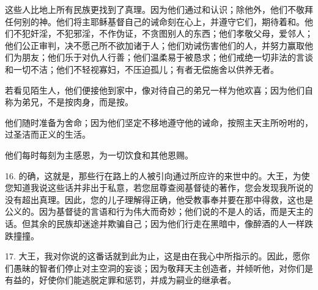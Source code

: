 这些人比地上所有民族更找到了真理。因为他们通过和认识；除他外，他们不敬拜任何别的神。他们将主耶稣基督自己的诫命刻在心上，并遵守它们，期待着和。他们不犯奸淫，不犯邪淫，不作伪证，不贪图别人的东西；他们孝敬父母，爱邻人；他们公正审判，决不愿己所不欲加诸于人；他们劝诫伤害他们的人，并努力赢取他们为朋友；他们乐于对仇人行善；他们温柔易于被恳求；他们戒绝一切非法的言谈和一切不洁；他们不轻视寡妇，不压迫孤儿；有者无偿施舍以供养无者。\par

若看见陌生人，他们便接他到家中，像对待自己的弟兄一样为他欢喜；因为他们自称为弟兄，不是按肉身，而是按。\par

他们随时准备为舍命；因为他们坚定不移地遵守他的诫命，按照主天主所吩咐的，过圣洁而正义的生活。\par

他们每时每刻为主感恩，为一切饮食和其他恩赐。\par

16. 的确，这就是，那些行在路上的人被引向通过所应许的来世中的。大王，为使您知道我说这些话并非出于私意，若您屈尊查阅基督徒的著作，您会发现我所说的没有超出真理。因此，您的儿子理解得正确，他受教事奉并要在那中得救，这也是公义的。因为基督徒的言语和行为伟大而奇妙；他们说的不是人的话，而是天主的话。但其余的民族却迷途并欺骗自己；因为他们行走在黑暗中，像醉酒的人一样跌跌撞撞。\par

17. 大王，我对你说的这番话就到此为止，这是由在我心中所指示的。因此，愿你们愚昧的智者们停止对主空洞的妄谈；因为敬拜天主创造者，并倾听他，对你们是有益的，好使你们能逃脱定罪和惩罚，并成为嗣业的继承者。\par

